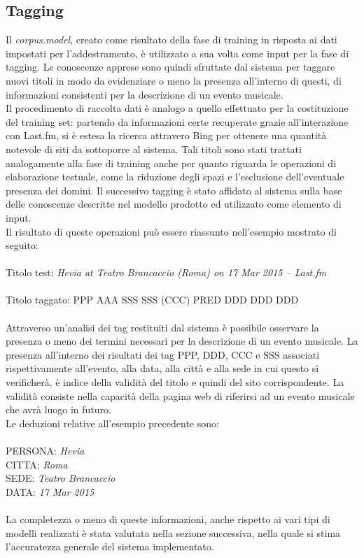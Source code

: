\documentclass[a4paper]{report}
\begin{document}
\subsection{Tagging}
Il \textit{corpus.model}, creato come risultato della fase di training in risposta ai dati impostati per l'addestramento, è utilizzato a sua volta come input per la fase di tagging. Le conoscenze apprese sono quindi sfruttate dal sistema per taggare nuovi titoli in modo da evidenziare o meno la presenza all'interno di questi, di informazioni consistenti per la descrizione di un evento musicale. \\
Il procedimento di raccolta dati è analogo a quello effettuato per la costituzione del training set: partendo da informazioni certe recuperate grazie all'interazione con Last.fm, si è estesa la ricerca attravero Bing per ottenere una quantità notevole di siti da sottoporre al sistema. Tali titoli sono stati trattati analogamente alla fase di training anche per quanto riguarda le operazioni di elaborazione testuale, come la riduzione degli spazi e l'esclusione dell'eventuale presenza dei domini. Il successivo tagging è stato affidato al sistema sulla base delle conoscenze descritte nel modello prodotto ed utilizzato come elemento di input. \\
Il risultato di queste operazioni può essere riassunto nell'esempio mostrato di seguito: \\ \\
Titolo test: \textit{Hevia at Teatro Brancaccio  (Roma) on 17 Mar 2015 – Last.fm} \\ \\
Titolo taggato: PPP AAA SSS SSS (CCC) PRED DDD DDD DDD \\ \\
Attraverso un'analisi dei tag restituiti dal sistema è possibile osservare la presenza o meno dei termini necessari per la descrizione di un evento musicale. La presenza all'interno dei risultati dei tag PPP, DDD, CCC e SSS associati rispettivamente all'evento, alla data, alla città e alla sede in cui questo si verificherà, è indice della validità del titolo e quindi del sito corrispondente. La validità consiste nella capacità della pagina web di riferirsi ad un evento musicale che avrà luogo in futuro.\\ Le deduzioni relative all'esempio precedente sono: \\ \\
PERSONA: \textit{Hevia}\\
CITTA: \textit{Roma}\\
SEDE: \textit{Teatro Brancaccio}\\
DATA: \textit{17 Mar 2015} \\ \\
La completezza o meno di queste informazioni, anche rispetto ai vari tipi di modelli realizzati è stata valutata nella sezione successiva, nella quale si stima l'accuratezza generale del sistema implementato.
\end{document}
